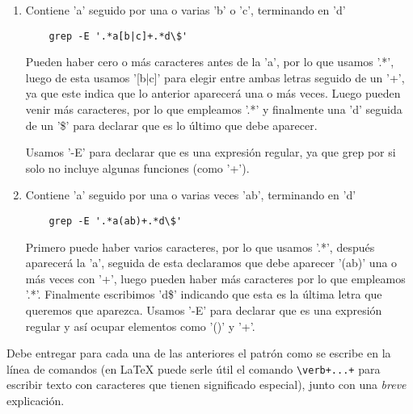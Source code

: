 \documentclass[spanish, fleqn]{article}
\begin{document}
\begin{enumerate}
  \item
    Contiene 'a' seguido por una o varias 'b' o 'c',
    terminando en 'd'
    \begin{verbatim}
    grep -E '.*a[b|c]+.*d\$'
    \end{verbatim}
    Pueden haber cero o más caracteres antes de la 'a', por lo que usamos '.*', luego de esta usamos '[b|c]' para elegir entre ambas letras seguido de un '+', ya que este indica que lo anterior aparecerá una o más veces. Luego pueden venir más caracteres, por lo que empleamos '.*' y finalmente una 'd' seguida de un '\$' para declarar que es lo último que debe aparecer.
    
    Usamos '-E' para declarar que es una expresión regular, ya que grep por si solo no incluye algunas funciones (como '+').
  \item
    Contiene 'a' seguido por una o varias veces 'ab', terminando en 'd'
    \begin{verbatim}
    grep -E '.*a(ab)+.*d\$'
    \end{verbatim}    
    Primero puede haber varios caracteres, por lo que usamos '.*', después aparecerá la 'a', seguida de esta declaramos que debe aparecer '(ab)' una o más veces con '+', luego pueden haber más caracteres por lo que empleamos '.*'. Finalmente escribimos 'd\$' indicando que esta es la última letra que queremos que aparezca.
    Usamos '-E' para declarar que es una expresión regular y así ocupar elementos como '()' y '+'.
  \end{enumerate}
  
  
  Debe entregar para cada una de las anteriores el patrón
  como se escribe en la línea de comandos
  (en \LaTeX{} puede serle útil el comando \verb!\verb+...+!
   para escribir texto con caracteres que tienen significado especial),
  junto con una \emph{breve} explicación.
\end{document}
